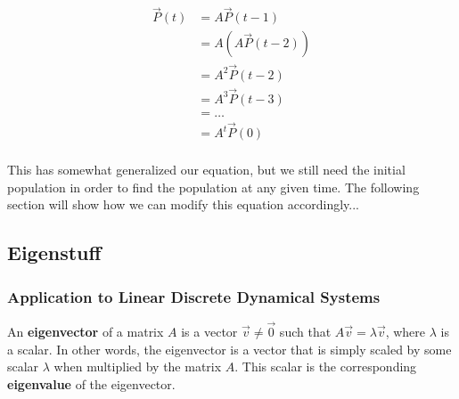 \documentclass[12pt]{article}
\begin{document}
{{\begin{equation}\label{eqn:poft}
    \begin{split}
        \vec{P}(t) &= A\vec{P}(t-1)\\
        &= A(A\vec{P}(t-2))\\
        &= A^2\vec{P}(t-2)\\
        &= A^3\vec{P}(t-3)\\
        &= \dots\\
        &= A^t\vec{P}(0)\\
    \end{split}
\end{equation}

This has somewhat generalized our equation, but we still need the initial population in order to find the population at any given time. The following section will show how we can modify this equation accordingly...

\subsection{Eigenstuff}
\subsubsection{Application to Linear Discrete Dynamical Systems}
An \textbf{eigenvector} of a matrix $A$ is a vector $\vec{v} \neq \vec{0}$ such that $A\vec{v} = \lambda\vec{v}$, where $\lambda$ is a scalar. In other words, the eigenvector is a vector that is simply scaled by some scalar $\lambda$ when multiplied by the matrix $A$. This scalar is the corresponding \textbf{eigenvalue} of the eigenvector.

}}
\end{document}
